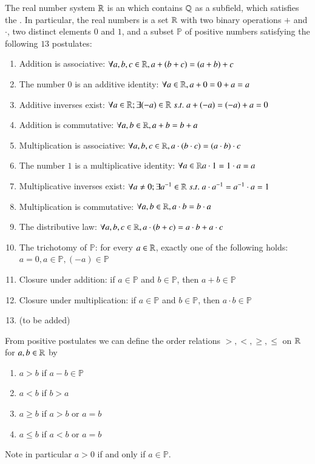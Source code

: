 \documentclass[12pt, a4paper, oneside, openright, titlepage]{book}
\begin{document}
\begin{defn}
    The real number system $\mathbb R$ is an  which contains $\mathbb Q$ as a subfield, which satisfies the . In particular, the real numbers is a set $\mathbb R$ with two binary operations $+$ and $\cdot$, two distinct elements $0$ and $1$, and a subset $\mathbb{P}$ of positive numbers satisfying the following $13$ postulates:
    \begin{enumerate}
        \item Addition is associative: $\forall a,b,c \in \mathbb R, a+(b+c) = (a+b)+c$
        \item The number $0$ is an additive identity: $\forall a \in \mathbb R, a+0 = 0+a = a$
        \item Additive inverses exist: $\forall a \in \mathbb R;\exists (-a) \in \mathbb R\;s.t.\;a+(-a) = (-a)+a=0$
        \item Addition is commutative: $\forall a,b \in \mathbb R, a+b = b+a$
        \item Multiplication is associative: $\forall a,b,c \in \mathbb R, a\cdot (b\cdot c) = (a \cdot b) \cdot c$
        \item The number $1$ is a multiplicative identity: $\forall a\in \mathbb R a\cdot 1 = 1\cdot a = a$
        \item Multiplicative inverses exist: $\forall a \neq 0;\exists a^{-1} \in \mathbb R\;s.t.\;a\cdot a^{-1} = a^{-1} \cdot a = 1$
        \item Multiplication is commutative: $\forall a,b \in \mathbb R, a\cdot b = b \cdot a$
        \item The distributive law: $\forall a,b,c \in \mathbb R, a\cdot (b+c) = a\cdot b + a \cdot c$
        \item The trichotomy of $\mathbb{P}$: for every $a \in \mathbb R$, exactly one of the following holds: $a = 0, a \in \mathbb{P}, (-a) \in \mathbb{P}$
        \item Closure under addition: if $a \in \mathbb{P}$ and $b \in \mathbb{P}$, then $a+b \in \mathbb{P}$
        \item Closure under multiplication: if $a \in \mathbb{P}$ and $b \in \mathbb{P}$, then $a\cdot b \in \mathbb{P}$
        \item (to be added)
    \end{enumerate}
    From positive postulates we can define the order relations $>, <, \geq, \leq$ on $\mathbb R$ for $a,b \in \mathbb R$ by \begin{enumerate}
        \item $a > b$ if $a-b \in \mathbb{P}$
        \item $a < b$ if $b > a$ 
        \item $a \geq b$ if $a > b$ or $a = b$
        \item $a \leq b$ if $a < b$ or $a = b$
    \end{enumerate}
    Note in particular $a > 0$ if and only if $a \in \mathbb{P}$.
\end{defn}
\end{document}
